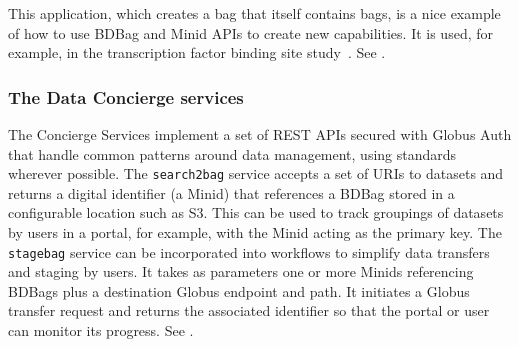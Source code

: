 \documentclass[11pt]{article}
\begin{document}
This application, which creates a bag that itself contains bags, is a nice example of how to
use BDBag and Minid APIs to create new capabilities.
It is used, for example, in the transcription factor
binding site study~\cite{madduri2018reproducible}.
See .
%

\subsubsection{The Data Concierge services}

The Concierge Services implement a set of REST APIs secured with Globus Auth that handle common patterns around data management, using standards wherever possible. 
The \texttt{search2bag} service accepts a set of URIs to datasets and returns a digital identifier (a Minid) that references a BDBag stored in a configurable location such as S3. 
This can be used to track groupings of datasets by users in a portal, for example, with the Minid acting as the primary key. 
The \texttt{stagebag} service can be incorporated into workflows to simplify data transfers and staging by users. 
It takes as parameters one or more Minids referencing BDBags plus
a destination Globus endpoint and path. 
It initiates a Globus transfer request and returns the associated identifier so that  
 the portal or user can monitor its progress. 
See .
\end{document}
